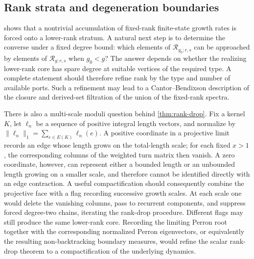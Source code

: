 \documentclass[11pt]{amsart}
\theoremstyle{plain}
\theoremstyle{definition}
\theoremstyle{remark}
\begin{document}
\subsection{Rank strata and degeneration boundaries}



 shows that a nontrivial accumulation of fixed-rank
finite-state growth rates is forced onto a lower-rank stratum.  A natural next
step is to determine the converse under a fixed degree bound: which elements
of \(\mathcal R_{g_0;r,s}\) can be approached by elements of
\(\mathcal R_{g;r,s}\) when \(g_0<g\)?  The answer depends on whether the
realizing lower-rank core has spare degree at suitable vertices of the
required type.  A complete statement should therefore refine rank by the
type and number of available ports.  Such a refinement may lead to a
Cantor--Bendixson description of the closure and derived-set filtration of
the union of the fixed-rank spectra.

There is also a multi-scale moduli question behind
\cref{thm:rank-drop}.  Fix a kernel \(K\), let \(\ell_n\) be a sequence of
positive integral length vectors, and normalize by
\(\|\ell_n\|_1=\sum_{e\in E(K)}\ell_n(e)\).  A positive coordinate in a
projective limit records an edge whose length grows on the total-length scale;
for each fixed \(x>1\), the corresponding columns of the weighted turn matrix
then vanish.  A zero coordinate, however, can represent either a bounded
length or an unbounded length growing on a smaller scale, and therefore cannot
be identified directly with an edge contraction.  A useful compactification
should consequently combine the projective face with a flag recording
successive growth scales.  At each scale one would delete the vanishing
columns, pass to recurrent components, and suppress forced degree-two chains,
iterating the rank-drop procedure.  Different flags may still produce the
same lower-rank core.  Recording the limiting Perron root together with the
corresponding normalized Perron eigenvectors, or equivalently the resulting
non-backtracking boundary measures, would refine the scalar rank-drop theorem
to a compactification of the underlying dynamics.
\end{document}
